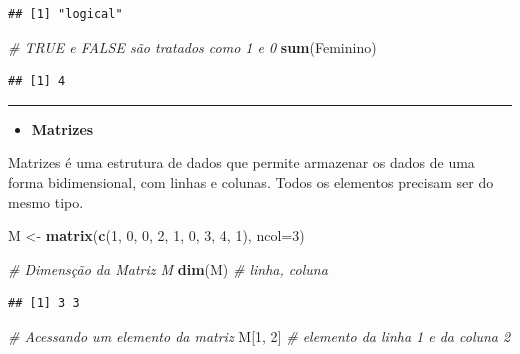 \documentclass[
]{book}
\newenvironment{Shaded}{\begin{snugshade}}{\end{snugshade}}
\newcommand{\AttributeTok}[1]{\textcolor[rgb]{0.13,0.29,0.53}{#1}}
\newcommand{\CommentTok}[1]{\textcolor[rgb]{0.56,0.35,0.01}{\textit{#1}}}
\newcommand{\DecValTok}[1]{\textcolor[rgb]{0.00,0.00,0.81}{#1}}
\newcommand{\FunctionTok}[1]{\textcolor[rgb]{0.13,0.29,0.53}{\textbf{#1}}}
\newcommand{\NormalTok}[1]{#1}
\newcommand{\OtherTok}[1]{\textcolor[rgb]{0.56,0.35,0.01}{#1}}
\providecommand{\tightlist}{%
  \setlength{\itemsep}{0pt}\setlength{\parskip}{0pt}}
\begin{document}
\begin{verbatim}
## [1] "logical"
\end{verbatim}

\begin{Shaded}
\begin{Highlighting}[]
\CommentTok{\# TRUE e FALSE são tratados como 1 e 0}
\FunctionTok{sum}\NormalTok{(Feminino)}
\end{Highlighting}
\end{Shaded}

\begin{verbatim}
## [1] 4
\end{verbatim}

\begin{center}\rule{0.5\linewidth}{0.5pt}\end{center}

\begin{itemize}
\tightlist
\item
  \textbf{Matrizes}
\end{itemize}

Matrizes é uma estrutura de dados que permite armazenar os dados de uma forma bidimensional, com linhas e colunas. Todos os elementos precisam ser do mesmo tipo.

\begin{Shaded}
\begin{Highlighting}[]
\NormalTok{M }\OtherTok{\textless{}{-}} \FunctionTok{matrix}\NormalTok{(}\FunctionTok{c}\NormalTok{(}\DecValTok{1}\NormalTok{, }\DecValTok{0}\NormalTok{, }\DecValTok{0}\NormalTok{, }\DecValTok{2}\NormalTok{, }\DecValTok{1}\NormalTok{, }\DecValTok{0}\NormalTok{, }\DecValTok{3}\NormalTok{, }\DecValTok{4}\NormalTok{, }\DecValTok{1}\NormalTok{), }\AttributeTok{ncol=}\DecValTok{3}\NormalTok{)}

\CommentTok{\# Dimensção da Matriz M}
\FunctionTok{dim}\NormalTok{(M) }\CommentTok{\# linha, coluna}
\end{Highlighting}
\end{Shaded}

\begin{verbatim}
## [1] 3 3
\end{verbatim}

\begin{Shaded}
\begin{Highlighting}[]
\CommentTok{\# Acessando um elemento da matriz}
\NormalTok{M[}\DecValTok{1}\NormalTok{, }\DecValTok{2}\NormalTok{] }\CommentTok{\# elemento da linha 1 e da coluna 2}
\end{Highlighting}
\end{Shaded}
\end{document}
